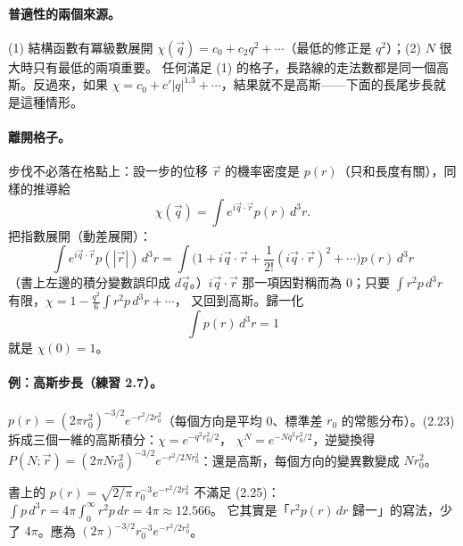 \paragraph{普適性的兩個來源。}
(1) 結構函數有冪級數展開 $\chi(\vec q)=c_0+c_2q^2+\cdots$（最低的修正是 $q^2$）；(2) $N$ 很大時只有最低的兩項重要。
任何滿足 (1) 的格子，長路線的走法數都是同一個高斯。反過來，如果 $\chi=c_0+c'|q|^{1.3}+\cdots$，結果就不是高斯——下面的長尾步長就是這種情形。

\paragraph{離開格子。}
步伐不必落在格點上：設一步的位移 $\vec r$ 的機率密度是 $p(r)$（只和長度有關），同樣的推導給
\[\chi(\vec q)=\int e^{i\vec q\cdot\vec r}p(r)\,d^3r.\tag{2.23}\]
把指數展開（動差展開）：
\[\int e^{i\vec q\cdot\vec r}p(|\vec r|)\,d^3r=\int\Big(1+i\vec q\cdot\vec r+\frac1{2!}(i\vec q\cdot\vec r)^2+\cdots\Big)p(r)\,d^3r\tag{2.24}\]
（書上左邊的積分變數誤印成 $d\vec q$。）$i\vec q\cdot\vec r$ 那一項因對稱而為 0；只要 $\int r^2p\,d^3r$ 有限，$\chi=1-\frac{q^2}{6}\int r^2p\,d^3r+\cdots$，
又回到高斯。歸一化
\[\int p(r)\,d^3r=1\tag{2.25}\]
就是 $\chi(0)=1$。

\paragraph{例：高斯步長（練習 2.7）。}
$p(r)=(2\pi r_0^2)^{-3/2}e^{-r^2/2r_0^2}$（每個方向是平均 0、標準差 $r_0$ 的常態分布）。(2.23) 拆成三個一維的高斯積分：$\chi=e^{-q^2r_0^2/2}$，
$\chi^N=e^{-Nq^2r_0^2/2}$，逆變換得 $P(N;\vec r)=(2\pi Nr_0^2)^{-3/2}e^{-r^2/2Nr_0^2}$：還是高斯，每個方向的變異數變成 $Nr_0^2$。
\begin{errbox}[p.~37，Ex.~2.7]
書上的 $p(r)=\sqrt{2/\pi}\,r_0^{-3}e^{-r^2/2r_0^2}$ 不滿足 (2.25)：$\int p\,d^3r=4\pi\int_0^\infty r^2p\,dr=4\pi\approx12.566$。
它其實是「$r^2p(r)\,dr$ 歸一」的寫法，少了 $4\pi$。應為 $(2\pi)^{-3/2}r_0^{-3}e^{-r^2/2r_0^2}$。
\end{errbox}

